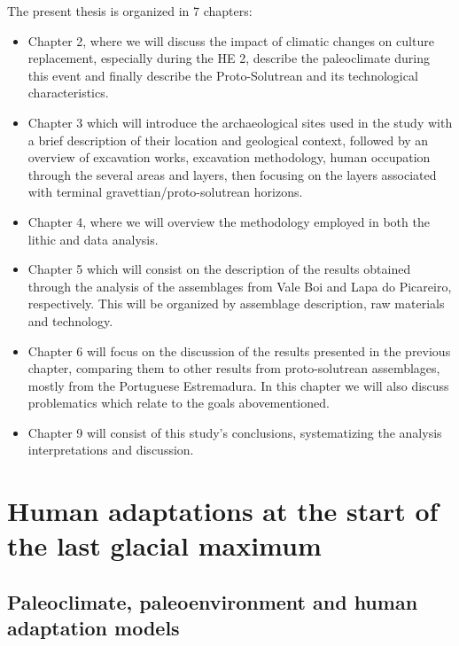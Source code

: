 \documentclass[12pt,twoside]{reedthesis}
\begin{document}
The present thesis is organized in 7 chapters:
\begin{itemize}
\item
  Chapter 2, where we will discuss the impact of climatic changes on culture replacement, especially during the HE 2, describe the paleoclimate during this event and finally describe the Proto-Solutrean and its technological characteristics.
\item
  Chapter 3 which will introduce the archaeological sites used in the study with a brief description of their location and geological context, followed by an overview of excavation works, excavation methodology, human occupation through the several areas and layers, then focusing on the layers associated with terminal gravettian/proto-solutrean horizons.
\item
  Chapter 4, where we will overview the methodology employed in both the lithic and data analysis.
\item
  Chapter 5 which will consist on the description of the results obtained through the analysis of the assemblages from Vale Boi and Lapa do Picareiro, respectively. This will be organized by assemblage description, raw materials and technology.
\item
  Chapter 6 will focus on the discussion of the results presented in the previous chapter, comparing them to other results from proto-solutrean assemblages, mostly from the Portuguese Estremadura. In this chapter we will also discuss problematics which relate to the goals abovementioned.
\item
  Chapter 9 will consist of this study's conclusions, systematizing the analysis interpretations and discussion.
\end{itemize}
\hypertarget{human-adaptations-at-the-start-of-the-last-glacial-maximum}{%
\chapter{Human adaptations at the start of the last glacial maximum}\label{human-adaptations-at-the-start-of-the-last-glacial-maximum}}

\hypertarget{paleoclimate-paleoenvironment-and-human-adaptation-models}{%
\section{Paleoclimate, paleoenvironment and human adaptation models}\label{paleoclimate-paleoenvironment-and-human-adaptation-models}}
\end{document}
